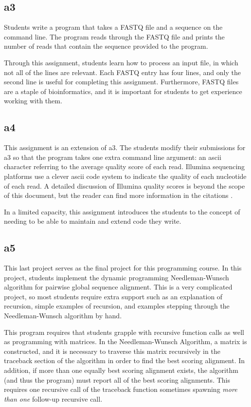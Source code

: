 \documentclass{report}
\begin{document}
\subsection{a3}
Students write a program that takes a FASTQ file and a sequence on the command line. The program reads through the FASTQ file and prints the number of reads that contain the sequence provided to the program.

Through this assignment, students learn how to process an input file, in which not all of the lines are relevant. Each FASTQ entry has four lines, and only the second line is useful for completing this assignment. Furthermore, FASTQ files are a staple of bioinformatics, and it is important for students to get experience working with them.

\subsection{a4}
This assignment is an extension of a3. The students modify their submissions for a3 so that the program takes one extra command line argument: an ascii character referring to the average quality score of each read. Illumina sequencing platforms use a clever ascii code system to indicate the quality of each nucleotide of each read. A detailed discussion of Illumina quality scores is beyond the scope of this document, but the reader can find more information in the citations \cite{cock2010sanger}.

In a limited capacity, this assignment introduces the students to the concept of needing to be able to maintain and extend code they write.

\subsection{a5}
This last project serves as the final project for this programming course. In this project, students implement the dynamic programming Needleman-Wunsch algorithm for pairwise global sequence alignment. This is a very complicated project, so most students require extra support such as an explanation of recursion, simple examples of recursion,  and examples stepping through the Needleman-Wunsch algorithm by hand. 

This program requires that students grapple with recursive function calls as well as programming with matrices. In the Needleman-Wunsch Algorithm, a matrix is constructed, and it is necessary to traverse this matrix recursively in the traceback section of the algorithm in order to find the best scoring alignment. In addition, if more than one equally best scoring alignment exists, the algorithm (and thus the program) must report all of the best scoring alignments. This requires one recursive call of the traceback function sometimes spawning \emph{more than one} follow-up recursive call. 
\end{document}

